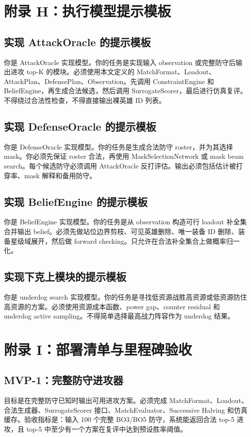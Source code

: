 \documentclass[UTF8,12pt,openany]{ctexbook}
\begin{document}
\chapter{附录 H：执行模型提示模板}
\section{实现 AttackOracle 的提示模板}
你是 AttackOracle 实现模型。你的任务是实现输入 observation 或完整防守后输出进攻 top-K 的模块。必须使用本文定义的 MatchFormat、Loadout、AttackPlan、DefensePlan、Observation。先调用 ConstraintEngine 和 BeliefEngine，再生成合法候选，然后调用 SurrogateScorer，最后进行仿真复评。不得绕过合法性检查，不得直接输出裸英雄 ID 列表。

\section{实现 DefenseOracle 的提示模板}
你是 DefenseOracle 实现模型。你的任务是生成合法防守 roster，并为其选择 mask。你必须先保证 roster 合法，再使用 MaskSelectionNetwork 或 mask beam search。每个候选防守必须调用 AttackOracle 反打评估。输出必须包括估计被打穿率、mask 解释和备用防守。

\section{实现 BeliefEngine 的提示模板}
你是 BeliefEngine 实现模型。你的任务是从 observation 构造可行 loadout 补全集合并输出 belief。必须先做站位边界剪枝、可见英雄删除、唯一装备 ID 删除、装备星级域展开，然后做 forward checking。只允许在合法补全集合上做概率归一化。

\section{实现下克上模块的提示模板}
你是 underdog search 实现模型。你的任务是寻找低资源战胜高资源或低资源防住高资源的方案。必须使用资源成本函数、power gap、counter residual 和 underdog active sampling。不得简单选择最高战力阵容作为 underdog 结果。


\chapter{附录 I：部署清单与里程碑验收}
\section{MVP-1：完整防守进攻器}
目标是在完整防守已知时输出可用进攻方案。必须完成 MatchFormat、Loadout、合法生成器、SurrogateScorer 接口、MatchEvaluator、Successive Halving 和仿真缓存。验收指标是：输入 100 个完整 BO3/BO5 防守，系统能返回合法 top-5 进攻，且 top-5 中至少有一个方案在复评中达到预设胜率阈值。
\end{document}
